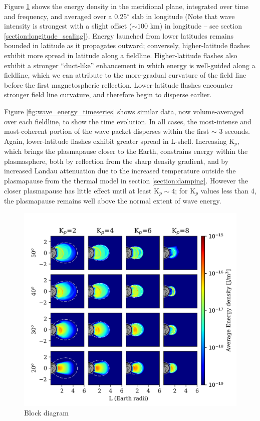Figure \ref{fig:energy_from_single_flash} shows the energy density in the meridional plane, integrated over time and frequency, and averaged over a 0.25$^\circ$ slab in longitude (Note that wave intensity is strongest with a slight offset ($\sim 100$ km) in longitude -- see section \ref{section:longitude_scaling}). Energy launched from lower latitudes remains bounded in latitude as it propagates outward; conversely, higher-latitude flashes exhibit more spread in latitude along a fieldline. Higher-latitude flashes also exhibit a stronger ``duct-like'' enhancement in which energy is well-guided along a fieldline, which we can attribute to the more-gradual curvature of the field line before the first magnetospheric reflection. Lower-latitude flashes encounter stronger field line curvature, and therefore begin to disperse earlier. 

Figure \ref{fig:wave_energy_timeseries} shows similar data, now volume-averaged over each fieldline, to show the time evolution. In all cases, the most-intense and most-coherent portion of the wave packet disperses within the first $\sim$ 3 seconds. Again, lower-latitude flashes exhibit greater spread in L-shell. Increasing K$_p$, which brings the plasmapause closer to the Earth, constrains energy within the plasmasphere, both by reflection from the sharp density gradient, and by increased Landau attenuation due to the increased temperature outside the plasmapause from the thermal model in section \ref{section:damping}. However the closer plasmapause has little effect until at least K$_p \sim 4$; for K$_p$ values less than 4, the plasmapause remains well above the normal extent of wave energy. 

\begin{figure}[h!]
\begin{center}
\includegraphics{figures/energy_from_single_flash_meridonal_plane.png}
\caption{Block diagram}
\label{fig:energy_from_single_flash}
\end{center}
\end{figure}

